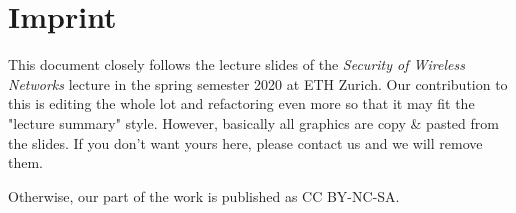 %
%
\appendix


\section{Imprint}

This document closely follows the lecture slides of the \textit{Security of Wireless Networks} lecture in the spring semester 2020 at ETH Zurich.
Our contribution to this is editing the whole lot and refactoring even more so that it may fit the "lecture summary" style.
However, basically all graphics are copy \& pasted from the slides. If you don't want yours here, please contact us and we will remove them.

Otherwise, our part of the work is published as CC BY-NC-SA.



%
%